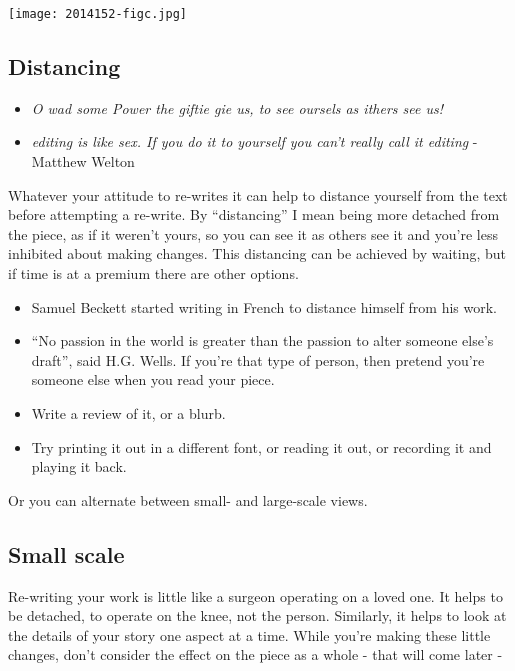 \documentclass[11pt]{article}
\begin{document}
\texttt{[image: 2014152-figc.jpg]}

\subsection*{Distancing}
\begin{itemize}
\item \textit{O wad some Power the giftie gie us, to see oursels as ithers see us!}
\item \textit{editing is like sex. If you do it to yourself you can't really call it editing} - Matthew Welton
\end{itemize}

Whatever your attitude to re-writes it can help to distance yourself from the text before attempting a re-write. By ``distancing'' I mean being more detached from the piece, as if it weren't yours, so you can see it as others see it and you're less inhibited about making changes. This distancing can be achieved by waiting, but if time is at a premium there are other options.
\begin{itemize}
\item Samuel Beckett started writing in French to distance himself from his work.

\item ``No passion in the world is greater than the passion to alter someone else's draft'', said H.G. Wells. If you're that type of person, then pretend you're someone else when you read your piece.
\item Write a review of it, or a blurb.
\item Try printing it out in a different font, or reading it out, or recording it and playing it back. 
\end{itemize}

Or you can alternate between small- and large-scale views.


\subsection*{Small scale}
Re-writing your work is little like a surgeon operating on a loved one. It helps to be detached, to operate on the knee, not the person. Similarly, it helps to look at the details of your story one aspect at a time. While you're making these little changes, don't consider the effect on the piece as a whole - that will come later -
\end{document}
